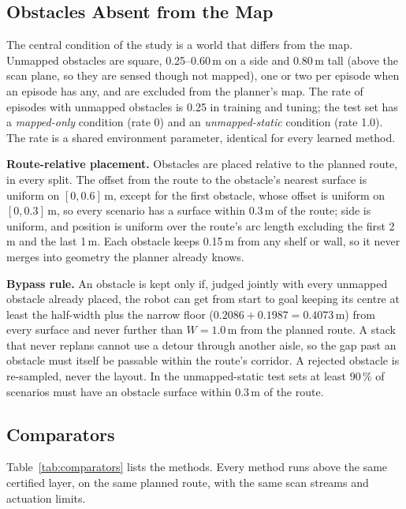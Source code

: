 \documentclass[sensors,article,submit,moreauthors]{Definitions/mdpi}
\begin{document}
\subsection{Obstacles Absent from the Map}\label{sec:unmapped}

The central condition of the study is a world that differs from the map. Unmapped obstacles are square, 0.25--0.60\,m on a side and 0.80\,m tall (above the scan plane, so they are sensed though not mapped), one or two per episode when an episode has any, and are excluded from the planner's map. The rate of episodes with unmapped obstacles is 0.25 in training and tuning; the test set has a \emph{mapped-only} condition (rate 0) and an \emph{unmapped-static} condition (rate 1.0). The rate is a shared environment parameter, identical for every learned method.

\textbf{Route-relative placement.} Obstacles are placed relative to the planned route, in every split. The offset from the route to the obstacle's nearest surface is uniform on $[0, 0.6]$\,m, except for the first obstacle, whose offset is uniform on $[0, 0.3]$\,m, so every scenario has a surface within 0.3\,m of the route; side is uniform, and position is uniform over the route's arc length excluding the first 2\,m and the last 1\,m. Each obstacle keeps 0.15\,m from any shelf or wall, so it never merges into geometry the planner already knows.

\textbf{Bypass rule.} An obstacle is kept only if, judged jointly with every unmapped obstacle already placed, the robot can get from start to goal keeping its centre at least the half-width plus the narrow floor ($0.2086 + 0.1987 = 0.4073$\,m) from every surface and never further than $W = 1.0$\,m from the planned route. A stack that never replans cannot use a detour through another aisle, so the gap past an obstacle must itself be passable within the route's corridor. A rejected obstacle is re-sampled, never the layout. In the unmapped-static test sets at least 90\,\% of scenarios must have an obstacle surface within 0.3\,m of the route.

\subsection{Comparators}\label{sec:comparators}

Table~\ref{tab:comparators} lists the methods. Every method runs above the same certified layer, on the same planned route, with the same scan streams and actuation limits.
\end{document}
